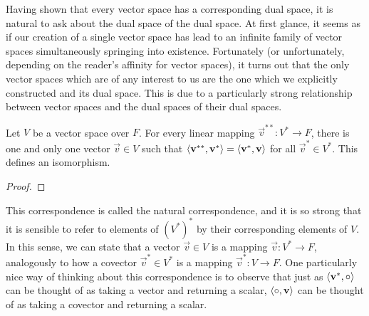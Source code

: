 \documentclass[../main.tex]{subfiles}
\begin{document}
    Having shown that every vector space has a corresponding dual space, it is natural to ask about the dual space of the dual space. At first glance, it seems as if our creation of a single vector space has lead to an infinite family of vector spaces simultaneously springing into existence. Fortunately (or unfortunately, depending on the reader's affinity for vector spaces), it turns out that the only vector spaces which are of any interest to us are the one which we explicitly constructed and its dual space. This is due to a particularly strong relationship between vector spaces and the dual spaces of their dual spaces.
    \begin{theorem}
        Let \(V\) be a vector space over \(F\). For every linear mapping \(\vec{v}^{**}:V^{*}\to{}F\), there is one and only one vector \(\vec{v}\in{}V\) such that \(\langle\mathbf{v}^{**},\mathbf{v}^{*}\rangle=\langle\mathbf{v}^{*},\mathbf{v}\rangle\) for all \(\vec{v}^{*}\in{}V^{*}\). This defines an isomorphism.
        \begin{proof}
        \end{proof}
    \end{theorem}
    This correspondence is called the natural correspondence, and it is so strong that it is sensible to refer to elements of \((V^{*})^{*}\) by their corresponding elements of \(V\). In this sense, we can state that a vector \(\vec{v}\in{}V\) is a mapping \(\vec{v}:V^{*}\to{}F\), analogously to how a covector \(\vec{v}^{*}\in{}V^{*}\) is a mapping \(\vec{v}^{*}:V\to{}F\). One particularly nice way of thinking about this correspondence is to observe that just as \(\langle\mathbf{v}^{*},\circ\rangle\) can be thought of as taking a vector and returning a scalar, \(\langle\circ,\mathbf{v}\rangle\) can be thought of as taking a covector and returning a scalar.
\end{document}
